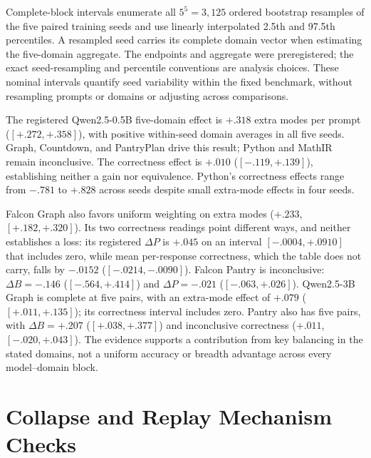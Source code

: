 \documentclass{article}
\newcommand{\1}{\mathbf 1}
\theoremstyle{remark}
\theoremstyle{definition}
\theoremstyle{plain}
\begin{document}
Complete-block intervals enumerate all $5^5=3{,}125$ ordered bootstrap
resamples of the five paired training seeds and use linearly interpolated
2.5th and 97.5th percentiles. A resampled seed carries its complete domain
vector when estimating the five-domain aggregate. The endpoints and
aggregate were preregistered; the exact seed-resampling and percentile
conventions are analysis choices. These nominal intervals quantify seed
variability within the fixed benchmark, without resampling prompts or
domains or adjusting across comparisons.

The registered Qwen2.5-0.5B five-domain effect is $+.318$ extra modes per
prompt ($[+.272,+.358]$), with positive within-seed domain averages in all
five seeds. Graph, Countdown, and PantryPlan drive this result; Python and
MathIR remain inconclusive. The correctness effect is $+.010$
($[-.119,+.139]$), establishing neither a gain nor equivalence. Python's
correctness effects range from $-.781$ to $+.828$ across seeds despite
small extra-mode effects in four seeds.

Falcon Graph also favors uniform weighting on extra modes ($+.233$,
$[+.182,+.320]$). Its two correctness readings point different ways, and
neither establishes a loss: its registered $\Delta P$
is $+.045$ on an interval $[-.0004,+.0910]$ that
includes zero, while mean per-response correctness, which the table does not
carry, falls by $-.0152$ ($[-.0214,-.0090]$). Falcon Pantry is
inconclusive: $\Delta B=-.146$ ($[-.564,+.414]$) and $\Delta P=-.021$
($[-.063,+.026]$). Qwen2.5-3B Graph is complete at five pairs, with an extra-mode effect of
$+.079$ ($[+.011,+.135]$); its correctness interval includes zero.
Pantry also has five pairs, with $\Delta B=+.207$
($[+.038,+.377]$) and inconclusive correctness ($+.011$, $[-.020,+.043]$).
The evidence supports a contribution from key balancing in the stated domains, not a
uniform accuracy or breadth advantage across every model--domain block.



\section{Collapse and Replay Mechanism Checks}
\label{app:ablations}


\end{document}
